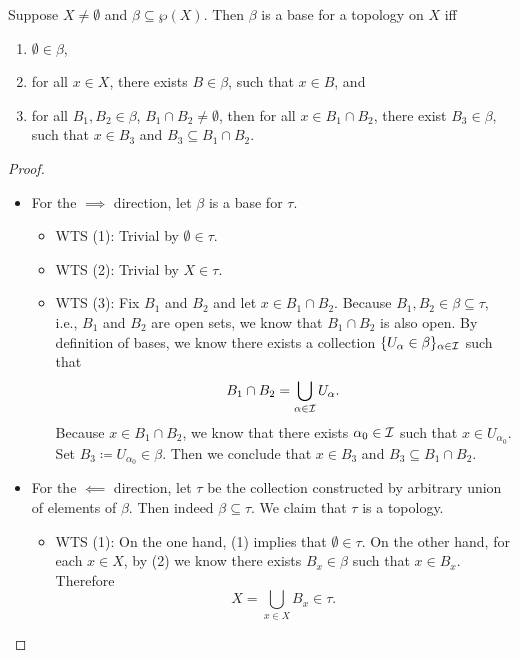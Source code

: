 \documentclass[screen]{techreport}
\numberwithin{equation}{section}
\begin{document}
\begin{proposition}\label{Prop:BaseStructure}
	Suppose $X \neq \emptyset$ and $\beta \subseteq \wp(X)$.
	Then $\beta$ is a base for a topology on $X$ iff
	\begin{enumerate}
		\item $\emptyset \in \beta$,
		\item for all $x \in X$, there exists $B \in \beta$, such that $x \in B$, and
		\item for all $B_1,B_2 \in \beta$, $B_1 \cap B_2 \neq \emptyset$, then for all $x \in B_1 \cap B_2$, there exist $B_3 \in \beta$, such that $x \in B_3$ and $B_3 \subseteq B_1 \cap B_2$.
	\end{enumerate}
\end{proposition}
\begin{proof}\
	\begin{itemize}
		\item For the ${\implies}$ direction, let $\beta$ is a base for $\tau$.
		\begin{itemize}
			\item WTS (1): Trivial by $\emptyset \in \tau$.
			\item WTS (2): Trivial by $X \in \tau$.
			\item WTS (3): Fix $B_1$ and $B_2$ and let $x \in B_1 \cap B_2$.
			Because $B_1,B_2 \in \beta \subseteq \tau$, i.e., $B_1$ and $B_2$ are open sets, we know that $B_1 \cap B_2$ is also open.
			By definition of bases, we know there exists a collection $\{U_\alpha \in \beta\}_{\alpha \in \mathcal{I}}$ such that
			\[
			B_1 \cap B_2 = \bigcup_{\alpha \in \mathcal{I}} U_\alpha.
			\]
			Because $x \in B_1 \cap B_2$, we know that there exists $\alpha_0 \in \mathcal{I}$ such that $x \in U_{\alpha_0}$.
			Set $B_3 \coloneqq U_{\alpha_0} \in \beta$.
			Then we conclude that $x \in B_3$ and $B_3 \subseteq B_1 \cap B_2$.
		\end{itemize}
		
		\item For the ${\impliedby}$ direction, let $\tau$ be the collection constructed by arbitrary union of elements of $\beta$.
		Then indeed $\beta \subseteq \tau$.
		We claim that $\tau$ is a topology.
		\begin{itemize}
			\item WTS (1): On the one hand, (1) implies that $\emptyset \in \tau$.
			On the other hand, for each $x \in X$, by (2) we know there exists $B_x \in \beta$ such that $x \in B_x$.
			Therefore
			\[
			X = \bigcup_{x \in X} B_x \in \tau.
			\]
			

\end{itemize}
\end{itemize}
\end{proof}
\end{document}
